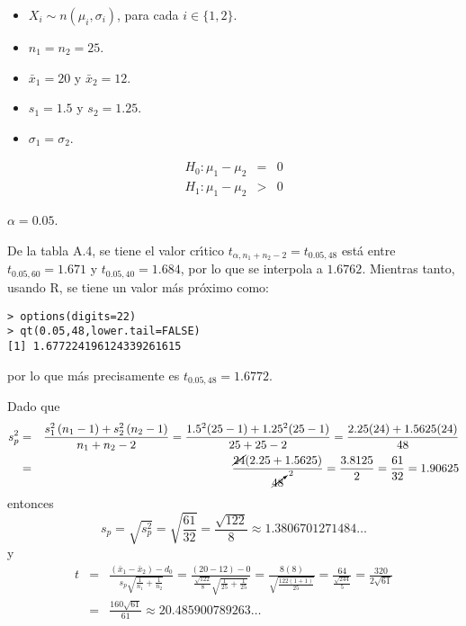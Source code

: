 \begin{solucion}
 \begin{datos}
  $\phantom{0}$
  \begin{itemize}
   \item $X_i \sim n\left( \mu_i, \sigma_i \right)$, para cada $i \in \{ 1, 2 \}$.
   \item $n_1 = n_2 = 25$.
   \item $\bar{x}_1 = 20$ y $\bar{x}_2 = 12$.
   \item $s_1 = 1.5$ y $s_2 = 1.25$.
   \item $\sigma_1 = \sigma_2$.
  \end{itemize}
 \end{datos}

 \begin{hipotesis}
  \begin{eqnarray*}
   H_0: \mu_1 - \mu_2 & = & 0 \\
   H_1: \mu_1 - \mu_2 & > & 0
  \end{eqnarray*}
 \end{hipotesis}

 \begin{significancia}
  $\alpha = 0.05$.
 \end{significancia}

 \begin{region}
  De la tabla A.4, se tiene el valor cr\'{\i}tico $t_{\alpha,n_1+n_2-2} = t_{0.05,48}$ est\'a entre $t_{0.05,60} = 1.671$ y $t_{0.05,40} = 1.684$, por lo que se interpola a $1.6762$. Mientras tanto, usando R, se tiene un valor m\'as pr\'oximo como:
  \begin{verbatim}
> options(digits=22)
> qt(0.05,48,lower.tail=FALSE)
[1] 1.677224196124339261615
  \end{verbatim}
  \vspace{-0.5cm}
  por lo que m\'as precisamente es $t_{0.05,48} = 1.6772$.
 \end{region}

 \begin{estadistico}
  Dado que
  \begin{eqnarray*}
   s_p^2 & = & \frac{s_1^2\left(n_1 - 1\right) + s_2^2\left(n_2 - 1\right)}{n_1 + n_2 - 2} = \frac{1.5^2(25-1) + 1.25^2(25-1)}{25+25-2} = \frac{2.25(24) + 1.5625(24)}{48} \\
   & = & \frac{\cancel{24}(2.25+1.5625)}{\cancelto{2}{48}} = \frac{3.8125}{2} = \frac{61}{32} = 1.90625
  \end{eqnarray*}
  entonces
  \begin{equation*}
   s_p = \sqrt{s_p^2} = \sqrt{\frac{61}{32}} = \frac{\sqrt{122}}{8} \approx 1.3806701271484\ldots
  \end{equation*}
  y
  \begin{eqnarray*}
   t & = & \frac{\left( \bar{x}_1 - \bar{x}_2 \right) - d_0}{s_p\sqrt{\frac{1}{n_1} + \frac{1}{n_2}}} = \frac{(20-12)-0}{\frac{\sqrt{122}}{8}\sqrt{\frac{1}{25}+\frac{1}{25}}} = \frac{8(8)}{\sqrt{\frac{122(1+1)}{25}}} = \frac{64}{\frac{\sqrt{244}}{5}} = \frac{320}{2\sqrt{61}} \\
   & = & \frac{160\sqrt{61}}{61} \approx 20.485900789263\ldots 
  \end{eqnarray*}
 \end{estadistico}


\end{solucion}
